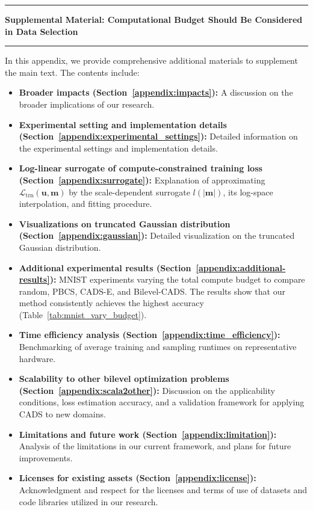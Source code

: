 \newpage
\appendix
\newcommand{\mytoptitlebar}{
  \noindent\rule{\textwidth}{4pt}
  \vskip 0.16in
}
\newcommand{\mybottomtitlebar}{
  \noindent\rule{\textwidth}{1.pt}
}


\mytoptitlebar
\begin{center}
	{\Large\bf Supplemental Material: Computational Budget Should Be Considered in Data Selection }
\end{center}
\mybottomtitlebar
\vskip 0.2in

In this appendix, we provide comprehensive additional materials to supplement the main text. The contents include:
\begin{itemize}
\item \textbf{Broader impacts (Section~\ref{appendix:impacts}):} A discussion on the broader implications of our research.
\item \textbf{Experimental setting and implementation details (Section~\ref{appendix:experimental_settings}):} Detailed information on the experimental settings and implementation details.
\item \textbf{Log-linear surrogate of compute-constrained training loss (Section~\ref{appendix:surrogate}):} Explanation of approximating \(\mathcal{L}_{\mathrm{trn}}(\mathbf{u},\mathbf{m})\) by the scale-dependent surrogate \(l(|\mathbf{m}|)\), its log-space interpolation, and fitting procedure.
\item \textbf{Visualizations on truncated Gaussian distribution (Section~\ref{appendix:gaussian}):} Detailed visualization on the truncated Gaussian distribution.
\item \textbf{Additional experimental results (Section~\ref{appendix:additional-results}):} MNIST experiments varying the total compute budget to compare random, PBCS, CADS-E, and Bilevel-CADS. The results show that our method consistently achieves the highest accuracy (Table~\ref{tab:mnist_vary_budget}). 
\item \textbf{Time efficiency analysis (Section~\ref{appendix:time_efficiency}):} Benchmarking of average training and sampling runtimes on representative hardware.
\item \textbf{Scalability to other bilevel optimization problems (Section~\ref{appendix:scala2other}):} Discussion on the applicability conditions, loss estimation accuracy, and a validation framework for applying CADS to new domains.
\item \textbf{Limitations and future work (Section~\ref{appendix:limitation}):} Analysis of the limitations in our current framework, and plans for future improvements.
\item \textbf{Licenses for existing assets (Section~\ref{appendix:license}):} Acknowledgment and respect for the licenses and terms of use of datasets and code libraries utilized in our research.
\end{itemize}

